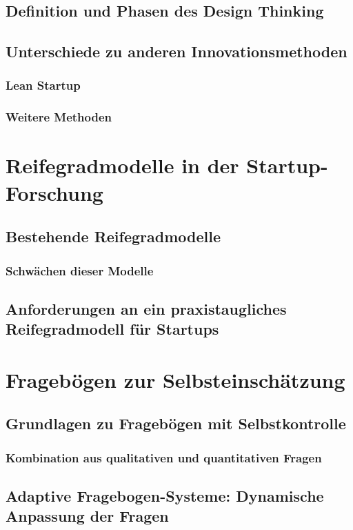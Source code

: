 \subsection{Definition und Phasen des Design Thinking}
\subsection{Unterschiede zu anderen Innovationsmethoden}
\subsubsection{Lean Startup}
\subsubsection{Weitere Methoden}

\section{Reifegradmodelle in der Startup-Forschung}
\subsection{Bestehende Reifegradmodelle}
\subsubsection{Schwächen dieser Modelle}
\subsection{Anforderungen an ein praxistaugliches Reifegradmodell für Startups}

\section{Fragebögen zur Selbsteinschätzung}
\subsection{Grundlagen zu Fragebögen mit Selbstkontrolle}
\subsubsection{Kombination aus qualitativen und quantitativen Fragen}
\subsection{Adaptive Fragebogen-Systeme: Dynamische Anpassung der Fragen}
